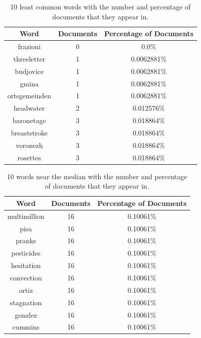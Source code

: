 \documentclass{article} %
\begin{document}
\begin{table}[t]
\caption{10 least common words with the number and percentage of documents that they appear in.}
\label{least-common-words-table}
\begin{center}
    \begin{tabular}{ | c | c | c |}
    \hline
    \textbf{Word} & \textbf{Documents} & \textbf{Percentage of Documents} \\ \hline

frazioni & 0 & 0.0\% \\ \hline 
threeletter & 1 & 0.0062881\% \\ \hline 
budjovice & 1 & 0.0062881\% \\ \hline 
gmina & 1 & 0.0062881\% \\ \hline 
ortsgemeinden & 1 & 0.0062881\% \\ \hline 
headwater & 2 & 0.012576\% \\ \hline 
baronetage & 3 & 0.018864\% \\ \hline 
breaststroke & 3 & 0.018864\% \\ \hline 
voronezh & 3 & 0.018864\% \\ \hline 
rosettes & 3 & 0.018864\% \\ \hline 

\end{tabular}
\end{center}
\end{table}


\begin{table}[t]
\caption{10 words near the median with the number and percentage of documents that they appear in.}
\label{median-common-words-table}
\begin{center}
    \begin{tabular}{ | c | c | c |}
    \hline
    \textbf{Word} & \textbf{Documents} & \textbf{Percentage of Documents} \\ \hline

multimillion & 16 & 0.10061\% \\ \hline 
pisa & 16 & 0.10061\% \\ \hline 
pranks & 16 & 0.10061\% \\ \hline 
pesticides & 16 & 0.10061\% \\ \hline 
hesitation & 16 & 0.10061\% \\ \hline 
convection & 16 & 0.10061\% \\ \hline 
ortiz & 16 & 0.10061\% \\ \hline 
stagnation & 16 & 0.10061\% \\ \hline 
gonzlez & 16 & 0.10061\% \\ \hline 
cummins & 16 & 0.10061\% \\ \hline 

\end{tabular}
\end{center}
\end{table}
\end{document}
